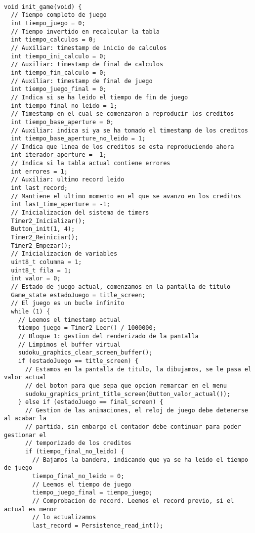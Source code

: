 \documentclass[12pt,letterpaper]{article}
\begin{document}
{
\scriptsize 
\lstset{language=C}
\begin{lstlisting}[frame=single]

void init_game(void) {
  // Tiempo completo de juego   
  int tiempo_juego = 0;
  // Tiempo invertido en recalcular la tabla
  int tiempo_calculos = 0;
  // Auxiliar: timestamp de inicio de calculos
  int tiempo_ini_calculo = 0;
  // Auxiliar: timestamp de final de calculos
  int tiempo_fin_calculo = 0;
  // Auxiliar: timestamp de final de juego
  int tiempo_juego_final = 0;
  // Indica si se ha leido el tiempo de fin de juego
  int tiempo_final_no_leido = 1;
  // Timestamp en el cual se comenzaron a reproducir los creditos
  int tiempo_base_aperture = 0;
  // Auxiliar: indica si ya se ha tomado el timestamp de los creditos
  int tiempo_base_aperture_no_leido = 1;
  // Indica que linea de los creditos se esta reproduciendo ahora
  int iterador_aperture = -1;
  // Indica si la tabla actual contiene errores
  int errores = 1;
  // Auxiliar: ultimo record leido
  int last_record;
  // Mantiene el ultimo momento en el que se avanzo en los creditos
  int last_time_aperture = -1;
  // Inicializacion del sistema de timers
  Timer2_Inicializar();
  Button_init(1, 4);
  Timer2_Reiniciar();
  Timer2_Empezar();
  // Inicializacion de variables
  uint8_t columna = 1;
  uint8_t fila = 1;
  int valor = 0;  
  // Estado de juego actual, comenzamos en la pantalla de titulo
  Game_state estadoJuego = title_screen;  
  // El juego es un bucle infinito
  while (1) {
    // Leemos el timestamp actual
    tiempo_juego = Timer2_Leer() / 1000000;
    // Bloque 1: gestion del renderizado de la pantalla
    // Limpimos el buffer virtual
    sudoku_graphics_clear_screen_buffer();
    if (estadoJuego == title_screen) {
      // Estamos en la pantalla de titulo, la dibujamos, se le pasa el valor actual
      // del boton para que sepa que opcion remarcar en el menu
      sudoku_graphics_print_title_screen(Button_valor_actual());
    } else if (estadoJuego == final_screen) {
      // Gestion de las animaciones, el reloj de juego debe detenerse al acabar la
      // partida, sin embargo el contador debe continuar para poder gestionar el 
      // temporizado de los creditos
      if (tiempo_final_no_leido) {
        // Bajamos la bandera, indicando que ya se ha leido el tiempo de juego
        tiempo_final_no_leido = 0;
        // Leemos el tiempo de juego
        tiempo_juego_final = tiempo_juego;
        // Comprobacion de record. Leemos el record previo, si el actual es menor
        // lo actualizamos
        last_record = Persistence_read_int();

\end{lstlisting}}
\end{document}
